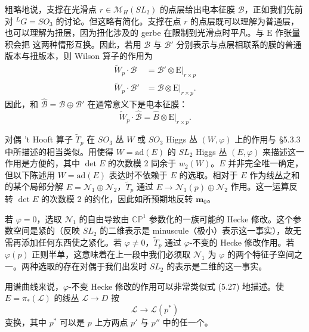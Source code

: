 粗略地说，支撑在光滑点 $r\in\mathcal{M}_H(SL_2)$ 的点层给出电本征膜 $\mathcal{B}$，正如我们先前对 ${}^{L}G=SO_3$ 的讨论。但这略有简化。支撑在点 $r$ 的点层既可以理解为普通层，也可以理解为扭层，因为扭化涉及的 gerbe 在限制到光滑点时平凡。与 $\mathrm{E}$ 作张量积会把
这两种情形互换。因此，若用 $\mathcal{B}$ 与 $\mathcal{B}'$ 分别表示与点层相联系的膜的普通版本与扭版本，则 Wilson 算子的作用为
\begin{equation}\tag{5.35}
\begin{aligned}
\widetilde{W}_p\cdot\mathcal{B} &= \mathcal{B}'\otimes\mathrm{E}|_{r\times p}\\
\widetilde{W}_p\cdot\mathcal{B}' &= \mathcal{B}\otimes\mathrm{E}|_{r\times p}.
\end{aligned}
\end{equation}
因此，和 $\widehat{\mathcal{B}}=\mathcal{B}\oplus\mathcal{B}'$ 在通常意义下是电本征膜：
\begin{equation}\tag{5.36}
\widetilde{W}_p\cdot\widehat{\mathcal{B}}=\widehat{B}\otimes\mathrm{E}|_{r\times p}.
\end{equation}

对偶 't Hooft 算子 $\widetilde{T}_p$ 在 $SO_3$ 丛 $W$ 或 $SO_3$ Higgs 丛 $(W,\varphi)$ 上的作用与 §5.3.3 中所描述的相当类似。用使得 $W=\mathrm{ad}(E)$ 的 $SL_2$ Higgs 丛 $(E,\varphi)$ 来描述这一作用是方便的，其中 $\det E$ 的次数模 2 同余于 $w_2(W)$。$E$ 并非完全唯一确定，但以下陈述用 $W=\mathrm{ad}(E)$ 表达时不依赖于 $E$ 的选取。相对于 $E$ 作为线丛之和的某个局部分解 $E=\mathcal{N}_1\oplus\mathcal{N}_2$，$\widetilde{T}_p$ 通过 $E\to\mathcal{N}_1(p)\oplus\mathcal{N}_2$ 作用。这一运算反转 $\det E$ 的次数模 2 的约化，因此如所预期地反转 $\boldsymbol{m}_0$。

若 $\varphi=0$，选取 $\mathcal{N}_1$ 的自由导致由 $\mathbb{CP}^1$ 参数化的一族可能的 Hecke 修改。这个参数空间是紧的（反映 $SL_2$ 的二维表示是 minuscule（极小）表示这一事实），故无需再添加任何东西使之紧化。若 $\varphi\neq0$，$\widetilde{T}_p$ 通过 $\varphi$-不变的 Hecke 修改作用。若 $\varphi(p)$ 正则半单，这意味着在上一段中我们必须取 $\mathcal{N}_1$ 为 $\varphi$ 的两个特征子空间之一。两种选取的存在对偶于我们出发时 $SL_2$ 的表示是二维的这一事实。

用谱曲线来说，$\varphi$-不变 Hecke 修改的作用可以非常类似式 (5.27) 地描述。使 $E=\pi_*(\mathcal{L})$ 的线丛 $\mathcal{L}\to D$ 按
\begin{equation}\tag{5.37}
\mathcal{L}\to\mathcal{L}(p^*)
\end{equation}
变换，其中 $p^*$ 可以是 $p$ 上方两点 $p'$ 与 $p''$ 中的任一个。

